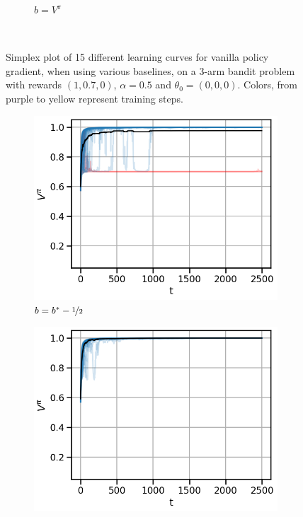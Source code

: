 \begin{figure}[!ht]
\begin{subfigure}[b]{0.245\linewidth}
    \caption{$b=V^\pi$}
  \end{subfigure}
  \caption{Simplex plot of 15 different learning curves for vanilla policy gradient, when using various baselines, on a 3-arm bandit problem with rewards $(1, 0.7, 0)$, $\alpha = 0.5$ and $\theta_0 = (0, 0, 0)$. Colors, from purple to yellow represent training steps.}~\label{appfig:learning_curves_vpg_000_simplex}
\end{figure}

\begin{figure}[!ht]
\centering
  \begin{subfigure}[b]{0.245\linewidth}
    \includegraphics[width=\textwidth]{articles/baselines/figs/appendix_figs_3arm_000/vanilla_minvar_-05_eta=05.png}
    \caption{$b = b^\ast - \nicefrac{1}{2}$}
  \end{subfigure}
    \begin{subfigure}[b]{0.245\linewidth}
    \includegraphics[width=\textwidth]{articles/baselines/figs/appendix_figs_3arm_000/vanilla_minvar_0_eta=05.png}

\end{subfigure}
\end{figure}
